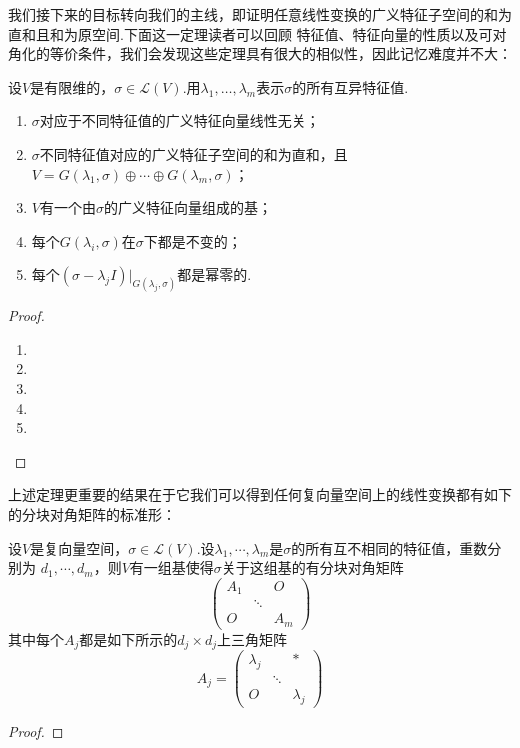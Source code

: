 我们接下来的目标转向我们的主线，即证明任意线性变换的广义特征子空间的和为直和且和为原空间.下面这一定理读者可以回顾
特征值、特征向量的性质以及可对角化的等价条件，我们会发现这些定理具有很大的相似性，因此记忆难度并不大：
\begin{theorem} \label{thm:20:广义特征性质}
    设$V$是有限维的，$\sigma\in \mathcal{L}(V)$.用$\lambda_1,\ldots,\lambda_m$表示$\sigma$的所有互异特征值.
    \begin{enumerate}[label=(\arabic*)]
        \item $\sigma$对应于不同特征值的广义特征向量线性无关；

        \item $\sigma$不同特征值对应的广义特征子空间的和为直和，且$V=G(\lambda_1,\sigma)\oplus\cdots\oplus
        G(\lambda_m,\sigma)$；

        \item $V$有一个由$\sigma$的广义特征向量组成的基；

        \item 每个$G(\lambda_i,\sigma)$在$\sigma$下都是不变的；

        \item 每个$(\sigma-\lambda_j I)\vert_{G(\lambda_j,\sigma)}$都是幂零的.
    \end{enumerate}
\end{theorem}
\begin{proof}
    \begin{enumerate}[label=(\arabic*)]
        \item 
        \item 
        \item 
        \item 
        \item 
    \end{enumerate}
\end{proof}

上述定理更重要的结果在于它我们可以得到任何复向量空间上的线性变换都有如下的分块对角矩阵的标准形：
\begin{theorem}
    设$V$是复向量空间，$\sigma\in \mathcal{L}(V)$.设$\lambda_1,\cdots,\lambda_m$是$\sigma$的所有互不相同的特征值，重数分别为
    $d_1,\cdots,d_m$，则$V$有一组基使得$\sigma$关于这组基的有分块对角矩阵
    \[\begin{pmatrix}
        A_1 &  & O \\  & \ddots &  \\ O &  & A_m
    \end{pmatrix}\]
    其中每个$A_j$都是如下所示的$d_j\times d_j$上三角矩阵
    \[A_j=\begin{pmatrix}
        \lambda_j &  & * \\  & \ddots &  \\ O &  & \lambda_j
    \end{pmatrix}\]
\end{theorem}
\begin{proof}
    
\end{proof}

